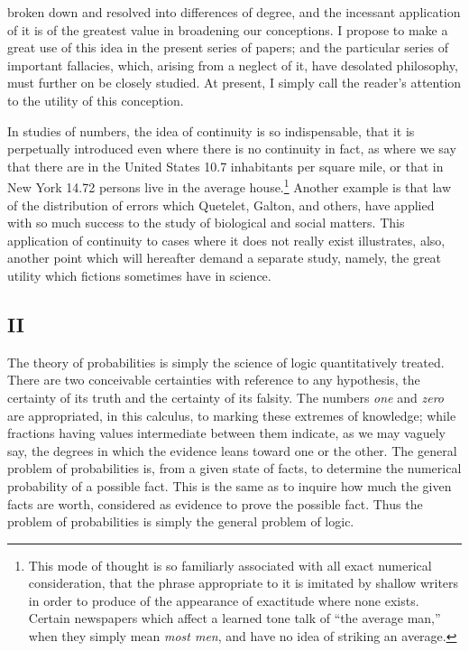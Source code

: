 broken down and resolved into differences of degree, and the incessant application of it is of the greatest value in broadening our conceptions. I propose to make a great use of this idea in the present series of papers; and the particular series of important fallacies, which, arising from a neglect of it, have desolated philosophy, must further on be closely studied. At present, I simply call the reader's attention to the utility of this conception.

In studies of numbers, the idea of continuity is so indispensable, that it is perpetually introduced even where there is no continuity in fact, as where we say that there are in the United States 10.7 inhabitants per square mile, or that in New York 14.72 persons live in the average house.\footnote{This mode of thought is so familiarly associated with all exact numerical consideration, that the phrase appropriate to it is imitated by shallow writers in order to produce of the appearance of exactitude where none exists. Certain newspapers which affect a learned tone talk of ``the average man,'' when they simply mean \emph{most men}, and have no idea of striking an average.} Another example is that law of the distribution of errors which Quetelet, Galton, and others, have applied with so much success to the study of biological and social matters. This application of continuity to cases where it does not really exist illustrates, also, another point which will hereafter demand a separate study, namely, the great utility which fictions sometimes have in science.

\subsection*{II}

The theory of probabilities is simply the science of logic quantitatively treated. There are two conceivable certainties with reference to any hypothesis, the certainty of its truth and the certainty of its falsity. The numbers \emph{one} and \emph{zero} are appropriated, in this calculus, to marking these extremes of knowledge; while fractions having values intermediate between them indicate, as we may vaguely say, the degrees in which the evidence leans toward one or the other. The general problem of probabilities is, from a given state of facts, to determine the numerical probability of a possible fact. This is the same as to inquire how much the given facts are worth, considered as evidence to prove the possible fact. Thus the problem of probabilities is simply the general problem of logic.

